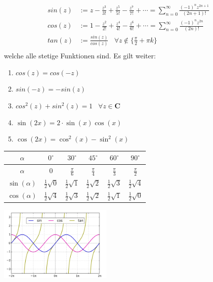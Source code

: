\documentclass[8pt]{extarticle}
\begin{document}
\begin{multicols*}{3}
  \begin{align*}
    sin(z) & := z - \frac{z^3}{3!} + \frac{z^5}{5!} - \frac{z^7}{7!} + \cdots = \sum_{n = 0}^\infty \frac{(-1)^n z^{2n + 1}}{(2n+1)!} \\
    cos(z) & := 1 - \frac{z^2}{2!} + \frac{z^4}{4!} - \frac{z^6}{6!} + \cdots = \sum_{n = 0}^\infty \frac{(-1)^n z^{2n}}{(2n)!}       \\
    tan(z) & := \frac{sin(z)}{cos(z)}\;\;\; \forall z \not \in \{\frac{\pi}{2} + \pi k\}                                              \\
  \end{align*}
  welche alle stetige Funktionen sind. Es gilt weiter:
  \begin{enumerate}[label=(\arabic*)]
    \item $cos(z) = cos(-z)$
    \item $sin(-z) = -sin(z)$
    \item $cos^2(z) + sin^2(z) = 1 \;\;\; \forall z \in \mathbf{C}$
    \item $\sin(2x) = 2 \cdot \sin(x) \cos(x)$
    \item $\cos(2x) = \cos^2(x) - \sin^2(x)$
  \end{enumerate}
  \begin{center}
    \begin{tabular}{ |c c c c c c| }
      \hline
      $\alpha$       & $0^\circ$              & $30^\circ$             & $45^\circ$             & $60^\circ$             & $90^\circ$             \\
      \hline
      $\alpha$       & $0$                    & $\frac{\pi}{6}$        & $\frac{\pi}{4}$        & $\frac{\pi}{3}$        & $\frac{\pi}{2}$        \\
      \hline
      $\sin(\alpha)$ & $\frac{1}{2} \sqrt{0}$ & $\frac{1}{2} \sqrt{1}$ & $\frac{1}{2} \sqrt{2}$ & $\frac{1}{2} \sqrt{3}$ & $\frac{1}{2} \sqrt{4}$ \\
      \hline
      $\cos(\alpha)$ & $\frac{1}{2} \sqrt{4}$ & $\frac{1}{2} \sqrt{3}$ & $\frac{1}{2} \sqrt{2}$ & $\frac{1}{2} \sqrt{1}$ & $\frac{1}{2} \sqrt{0}$ \\
      \hline
    \end{tabular}
  \end{center}
  \begin{center}  
  \includegraphics[width=5.5cm]{sincostan.png} \\

\end{center}
\end{multicols*}
\end{document}
